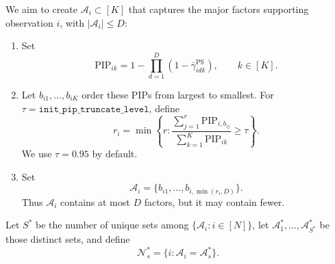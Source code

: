 \documentclass[11pt]{article}
\theoremstyle{plain}
\theoremstyle{definition}
\begin{document}
We aim to create $\mathcal A_i \subset [K]$ that captures the major factors
supporting observation $i$, with $|\mathcal A_i|\leq D$:
\begin{enumerate}
\item Set
\begin{equation}
  \mathrm{PIP}_{ik}
  =1-\prod_{d=1}^{D}(1-\bar\gamma^{\mathrm{PS}}_{idk}),
  \qquad k\in[K].
  \label{eq:rowwise-ps-pip}
\end{equation}
\item Let $b_{i1},\ldots,b_{iK}$ order these PIPs from largest to smallest.
For $\tau=\texttt{init\_pip\_truncate\_level}$, define
\[
  r_i
  =
  \min\left\{
    r:\frac{\sum_{j=1}^r\mathrm{PIP}_{i,b_{ij}}}
             {\sum_{k=1}^K\mathrm{PIP}_{ik}}
       \geq\tau
  \right\}.
\]
We use $\tau=0.95$ by default.
\item Set
\[
  \mathcal A_i
  =\{b_{i1},\ldots,b_{i,\min(r_i,D)}\}.
\]
Thus $\mathcal A_i$ contains at most $D$ factors, but it may contain fewer.
\end{enumerate}
Let $S^*$ be the number of unique sets among
$\{\mathcal A_i: i\in [N]\}$, let
$\mathcal A^*_{1}, \dots, \mathcal A^*_{S^*}$ be those distinct sets, and
define
\[
  \mathcal N_s^*=\{i:\mathcal A_i=\mathcal A_s^*\}.
\]
\end{document}
